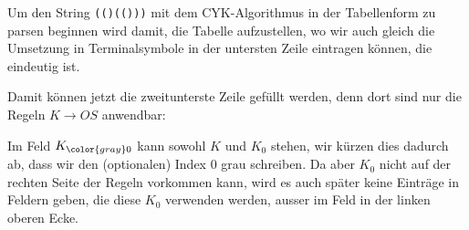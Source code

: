 \begin{loesung}
Um den String \texttt{(()(()))} mit dem CYK-Algorithmus in der Tabellenform
zu parsen beginnen wird damit, die Tabelle aufzustellen, wo wir auch gleich
die Umsetzung in Terminalsymbole in der untersten Zeile eintragen können,
die eindeutig ist. 
\def\h{0.6}
\def\punkt#1#2{
	({(#1)*\h},{(-#2)*\h})
}
\def\tabelle{
	\fill[color=gray!40]
		\punkt{1}{0} -- \punkt{1}{1}
		-- \punkt{2}{1} -- \punkt{2}{2}
		-- \punkt{3}{2} -- \punkt{3}{3}
		-- \punkt{4}{3} -- \punkt{4}{4}
		-- \punkt{5}{4} -- \punkt{5}{5}
		-- \punkt{6}{5} -- \punkt{6}{6}
		-- \punkt{7}{6} -- \punkt{7}{7}
		-- \punkt{8}{7} -- \punkt{8}{0} -- cycle;
	\draw (0,0) rectangle \punkt{8}{8};
	\foreach \x in {1,...,7}{
		\draw \punkt{\x}{0} -- \punkt{\x}{8};
	}
	\foreach \y in {1,...,7}{
		\draw \punkt{0}{\y} -- \punkt{8}{\y};
	}
	\node at \punkt{0.5}{8.5} {\texttt{(}};
	\node at \punkt{1.5}{8.5} {\texttt{(}};
	\node at \punkt{2.5}{8.5} {\texttt{)}};
	\node at \punkt{3.5}{8.5} {\texttt{(}};
	\node at \punkt{4.5}{8.5} {\texttt{(}};
	\node at \punkt{5.5}{8.5} {\texttt{)}};
	\node at \punkt{6.5}{8.5} {\texttt{)}};
	\node at \punkt{7.5}{8.5} {\texttt{)}};
	\node at \punkt{0.5}{7.5} {$O$};
	\node at \punkt{1.5}{7.5} {$O$};
	\node at \punkt{2.5}{7.5} {$S$};
	\node at \punkt{3.5}{7.5} {$O$};
	\node at \punkt{4.5}{7.5} {$O$};
	\node at \punkt{5.5}{7.5} {$S$};
	\node at \punkt{6.5}{7.5} {$S$};
	\node at \punkt{7.5}{7.5} {$S$};
}
\def\zeile#1{
	\fill[color=red!20] \punkt{0}{(#1-1)} rectangle \punkt{#1}{(#1)};
}
\def\zeilezwei{
	\node at \punkt{1.5}{6.5} {$K_{\color{gray}0}$};
	\node at \punkt{4.5}{6.5} {$K_{\color{gray}0}$};
}
\def\zeiledrei{
	\node at \punkt{4.5}{5.5} {$B$};
}
\def\zeilevier{
	\node at \punkt{3.5}{4.5} {$K_{\color{gray}0}$};
}
\def\zeilefuenf{
	\node at \punkt{2.5}{3.5} {$A_2$};
	\node at \punkt{3.5}{3.5} {$B$};
}
\def\zeilesechs{
	\node at \punkt{1.5}{2.5} {$K_{\color{gray}0}$};
}
\def\zeilesieben{
	\node at \punkt{1.5}{1.5} {$B$};
}
\def\zeileacht{
	\node at \punkt{0.5}{0.5} {$K_{\color{gray}0}$};
}
\begin{center}
\end{center}
Damit können jetzt die zweitunterste Zeile gefüllt werden, denn dort
sind nur die Regeln $K\to OS$ anwendbar:
\begin{center}
\end{center}
Im Feld $K_{\color{gray}0}$ kann sowohl $K$ und $K_0$ stehen, wir kürzen
dies dadurch ab, dass wir den (optionalen) Index $0$ grau schreiben.
Da aber $K_0$ nicht auf der rechten Seite der Regeln vorkommen kann, 
wird es auch später keine Einträge in Feldern geben, die diese $K_0$
verwenden werden, ausser im Feld in der linken oberen Ecke.


\end{loesung}
